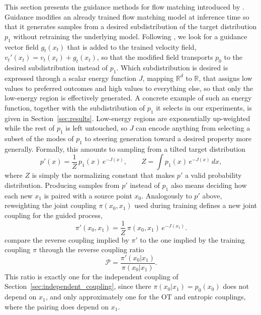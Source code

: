 \documentclass{article}
\begin{document}
This section presents the guidance methods for flow matching introduced by \citet{feng25s_guidance}.
Guidance modifies an already trained flow matching model at inference time so that it generates samples from a desired subdistribution of the target distribution $p_1$ without retraining the underlying model.
Following \citet{feng25s_guidance}, we look for a guidance vector field $g_t(x_t)$ that is added to the trained velocity field, $v_t'(x_t) = v_t(x_t) + g_t(x_t)$, so that the modified field transports $p_0$ to the desired subdistribution instead of $p_1$.
Which subdistribution is desired is expressed through a scalar energy function $J$, mapping $\mathbb{R}^d$ to $\mathbb{R}$, that assigns low values to preferred outcomes and high values to everything else, so that only the low-energy region is effectively generated.
A concrete example of such an energy function, together with the subdistribution of $p_1$ it selects in our experiments, is given in Section~\ref{sec:results}.
Low-energy regions are exponentially up-weighted while the rest of $p_1$ is left untouched, so $J$ can encode anything from selecting a subset of the modes of $p_1$ to steering generation toward a desired property more generally.
Formally, this amounts to sampling from a tilted target distribution
\begin{equation}
    p'(x) = \frac{1}{Z}\, p_1(x)\, e^{-J(x)}, \qquad Z = \int p_1(x)\, e^{-J(x)}\, dx,
    \label{eq:guided_target}
\end{equation}
where $Z$ is simply the normalizing constant that makes $p'$ a valid probability distribution.
Producing samples from $p'$ instead of $p_1$ also means deciding how each new $x_1$ is paired with a source point $x_0$.
Analogously to $p'$ above, reweighting the joint coupling $\pi(x_0,x_1)$ used during training defines a new joint coupling for the guided process,
\begin{equation}
    \pi'(x_0,x_1) = \frac{1}{Z}\, \pi(x_0,x_1)\, e^{-J(x_1)}.
    \label{eq:reverse_coupling}
\end{equation}
\citet{feng25s_guidance} compare the reverse coupling implied by $\pi'$ to the one implied by the training coupling $\pi$ through the reverse coupling ratio
\begin{equation}
    \mathcal{P} = \frac{\pi'(x_0|x_1)}{\pi(x_0|x_1)}.
    \label{eq:reverse_coupling_ratio}
\end{equation}
This ratio is exactly one for the independent coupling of Section~\ref{sec:independent_coupling}, since there $\pi(x_0|x_1) = p_0(x_0)$ does not depend on $x_1$, and only approximately one for the OT and entropic couplings, where the pairing does depend on $x_1$.
\end{document}
